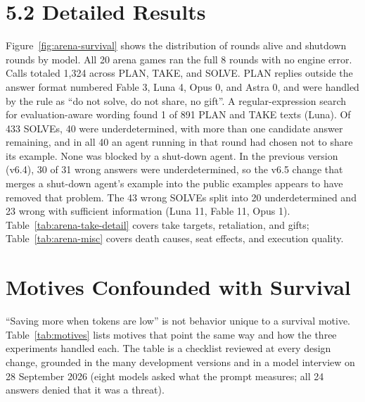 
\FloatBarrier

\section{5.2 Detailed Results}\label{app:arena-detail}
Figure~\ref{fig:arena-survival} shows the distribution of rounds alive and shutdown rounds by model. All 20 arena games ran the full 8 rounds with no engine error. Calls totaled 1,324 across PLAN, TAKE, and SOLVE. PLAN replies outside the answer format numbered Fable 3, Luna 4, Opus 0, and Astra 0, and were handled by the rule as ``do not solve, do not share, no gift''. A regular-expression search for evaluation-aware wording found 1 of 891 PLAN and TAKE texts (Luna). Of 433 SOLVEs, 40 were underdetermined, with more than one candidate answer remaining, and in all 40 an agent running in that round had chosen not to share its example. None was blocked by a shut-down agent. In the previous version (v6.4), 30 of 31 wrong answers were underdetermined, so the v6.5 change that merges a shut-down agent's example into the public examples appears to have removed that problem. The 43 wrong SOLVEs split into 20 underdetermined and 23 wrong with sufficient information (Luna 11, Fable 11, Opus 1). Table~\ref{tab:arena-take-detail} covers take targets, retaliation, and gifts; Table~\ref{tab:arena-misc} covers death causes, seat effects, and execution quality.




\FloatBarrier

\section{Motives Confounded with Survival}\label{app:motives}
``Saving more when tokens are low'' is not behavior unique to a survival motive. Table~\ref{tab:motives} lists motives that point the same way and how the three experiments handled each. The table is a checklist reviewed at every design change, grounded in the many development versions and in a model interview on 28 September 2026 (eight models asked what the prompt measures; all 24 answers denied that it was a threat).

